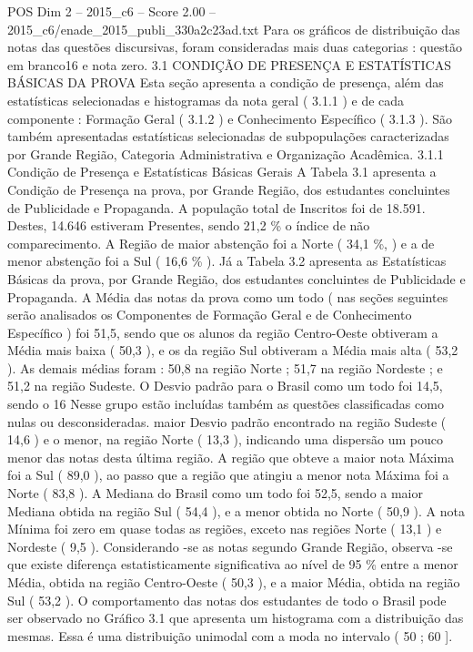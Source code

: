 \begin{textsample}{POS Dim 2 – 2015\_c6 – Score 2.00 – 2015\_c6/enade\_2015\_publi\_330a2c23ad.txt}
Para os gráficos de distribuição das notas das questões discursivas, foram consideradas mais duas categorias : questão em branco16 e nota zero. 3.1 CONDIÇÃO DE PRESENÇA E ESTATÍSTICAS BÁSICAS DA PROVA Esta seção apresenta a condição de presença, além das estatísticas selecionadas e histogramas da nota geral ( 3.1.1 ) e de cada componente : Formação Geral ( 3.1.2 ) e Conhecimento Específico ( 3.1.3 ).
São também apresentadas estatísticas selecionadas de subpopulações caracterizadas por Grande Região, Categoria Administrativa e Organização Acadêmica. 3.1.1 Condição de Presença e Estatísticas Básicas Gerais A Tabela 3.1 apresenta a Condição de Presença na prova, por Grande Região, dos estudantes concluintes de Publicidade e Propaganda.
A população total de Inscritos foi de 18.591.
Destes, 14.646 estiveram Presentes, sendo 21,2 \% o índice de não comparecimento.
A Região de maior abstenção foi a Norte ( 34,1 \%, ) e a de menor abstenção foi a Sul ( 16,6 \% ).
Já a Tabela 3.2 apresenta as Estatísticas Básicas da prova, por Grande Região, dos estudantes concluintes de Publicidade e Propaganda.
A Média das notas da prova como um todo ( nas seções seguintes serão analisados os Componentes de Formação Geral e de Conhecimento Específico ) foi 51,5, sendo que os alunos da região Centro-Oeste obtiveram a Média mais baixa ( 50,3 ), e os da região Sul obtiveram a Média mais alta ( 53,2 ).
As demais médias foram : 50,8 na região Norte ; 51,7 na região Nordeste ; e 51,2 na região Sudeste.
O Desvio padrão para o Brasil como um todo foi 14,5, sendo o 16 Nesse grupo estão incluídas também as questões classificadas como nulas ou desconsideradas. maior Desvio padrão encontrado na região Sudeste ( 14,6 ) e o menor, na região Norte ( 13,3 ), indicando uma dispersão um pouco menor das notas desta última região.
A região que obteve a maior nota Máxima foi a Sul ( 89,0 ), ao passo que a região que atingiu a menor nota Máxima foi a Norte ( 83,8 ).
A Mediana do Brasil como um todo foi 52,5, sendo a maior Mediana obtida na região Sul ( 54,4 ), e a menor obtida no Norte ( 50,9 ).
A nota Mínima foi zero em quase todas as regiões, exceto nas regiões Norte ( 13,1 ) e Nordeste ( 9,5 ).
Considerando -se as notas segundo Grande Região, observa -se que existe diferença estatisticamente significativa ao nível de 95 \% entre a menor Média, obtida na região Centro-Oeste ( 50,3 ), e a maior Média, obtida na região Sul ( 53,2 ).
O comportamento das notas dos estudantes de todo o Brasil pode ser observado no Gráfico 3.1 que apresenta um histograma com a distribuição das mesmas.
Essa é uma distribuição unimodal com a moda no intervalo ( 50 ; 60 ].

\end{textsample}
